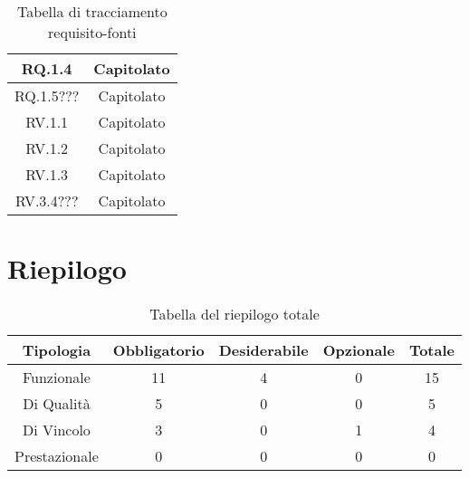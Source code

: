 \begin{table}[H]
\begin{tabular}{|c|c|}
    RQ.1.4 & Capitolato \\ \hline
    \rowcolor[HTML]{C0C0C0}
    RQ.1.5??? & Capitolato \\ \hline
    \rowcolor[HTML]{EFEFEF}
    RV.1.1 & Capitolato \\ \hline
    \rowcolor[HTML]{C0C0C0}
    RV.1.2 & Capitolato \\ \hline
    \rowcolor[HTML]{EFEFEF}
    RV.1.3 & Capitolato \\ \hline
    \rowcolor[HTML]{C0C0C0}
    RV.3.4??? & Capitolato \\ \hline
  \end{tabular}
  \caption{Tabella di tracciamento requisito-fonti}
\end{table}


\section{Riepilogo}

\begin{table}[H]
  \centering
  \begin{tabular}{|c|c|c|c|c|}
    \hline
    \rowcolor[HTML]{036400}
    {\color[HTML]{FFFFFF} \textbf{Tipologia}} & {\color[HTML]{FFFFFF} \textbf{Obbligatorio}} & {\color[HTML]{FFFFFF} \textbf{Desiderabile}} & {\color[HTML]{FFFFFF} \textbf{Opzionale}}  & {\color[HTML]{FFFFFF} \textbf{Totale}} \\ \hline
    \rowcolor[HTML]{EFEFEF}
    Funzionale & 11 & 4 & 0 & 15 \\ \hline
    \rowcolor[HTML]{C0C0C0}
    Di Qualità & 5 & 0 & 0 & 5 \\ \hline
    \rowcolor[HTML]{EFEFEF}
    Di Vincolo & 3 & 0 & 1 & 4 \\ \hline
    \rowcolor[HTML]{C0C0C0}
    Prestazionale & 0 & 0 & 0 & 0 \\ \hline
  \end{tabular}
  \caption{Tabella del riepilogo totale}
\end{table}

